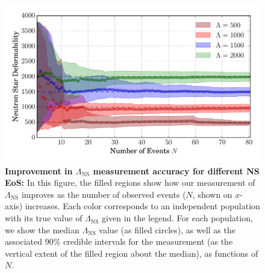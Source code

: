 \documentclass[aps,prd,amsmath,floats,floatfix, twocolumn,
superscriptaddress,nofootinbib,showpacs]{revtex4-1}
\newcommand{\lambdans}{\Lambda_\mathrm{NS}}
\begin{document}
%
\begin{figure}
\centering    
\includegraphics[width=1.05\columnwidth,trim=1cm 0 0 0]{FillBetweenRelErrorBarsLambda_vs_NShifted_AllLambda.pdf}
\caption{{\bf Improvement in $\lambdans$ measurement accuracy for different NS EoS:}
In this figure, the filled regions show how our measurement of $\lambdans$
improves as the number of observed events ($N$, shown on $x$-axis) increases.
Each color corresponds to an independent population with its true value of
$\lambdans$ given in the legend. For each population, we show the median 
$\lambdans$ value (as filled circles), as well as the associated
$90\%$ credible intervals for the measurement (as the vertical extent of the
filled region about the median), as functions of $N$.
}
\label{fig:TT_Lambda_vs_N_CI90_0}
\end{figure}
% 
\end{document}
